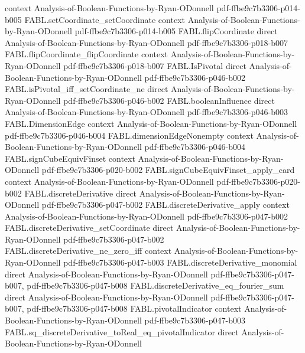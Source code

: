 \begin{theorem}
  {context}
  {Analysis-of-Boolean-Functions-by-Ryan-ODonnell}
  {pdf-ffbe9c7b3306-p014-b005}
\proofstep
  {FABL.setCoordinate_setCoordinate}
  {context}
  {Analysis-of-Boolean-Functions-by-Ryan-ODonnell}
  {pdf-ffbe9c7b3306-p014-b005}
\proofstep
  {FABL.flipCoordinate}
  {direct}
  {Analysis-of-Boolean-Functions-by-Ryan-ODonnell}
  {pdf-ffbe9c7b3306-p018-b007}
\proofstep
  {FABL.flipCoordinate_flipCoordinate}
  {context}
  {Analysis-of-Boolean-Functions-by-Ryan-ODonnell}
  {pdf-ffbe9c7b3306-p018-b007}
\proofstep
  {FABL.IsPivotal}
  {direct}
  {Analysis-of-Boolean-Functions-by-Ryan-ODonnell}
  {pdf-ffbe9c7b3306-p046-b002}
\proofstep
  {FABL.isPivotal_iff_setCoordinate_ne}
  {direct}
  {Analysis-of-Boolean-Functions-by-Ryan-ODonnell}
  {pdf-ffbe9c7b3306-p046-b002}
\proofstep
  {FABL.booleanInfluence}
  {direct}
  {Analysis-of-Boolean-Functions-by-Ryan-ODonnell}
  {pdf-ffbe9c7b3306-p046-b003}
\proofstep
  {FABL.DimensionEdge}
  {context}
  {Analysis-of-Boolean-Functions-by-Ryan-ODonnell}
  {pdf-ffbe9c7b3306-p046-b004}
\proofstep
  {FABL.dimensionEdgeNonempty}
  {context}
  {Analysis-of-Boolean-Functions-by-Ryan-ODonnell}
  {pdf-ffbe9c7b3306-p046-b004}
\proofstep
  {FABL.signCubeEquivFinset}
  {context}
  {Analysis-of-Boolean-Functions-by-Ryan-ODonnell}
  {pdf-ffbe9c7b3306-p020-b002}
\proofstep
  {FABL.signCubeEquivFinset_apply_card}
  {context}
  {Analysis-of-Boolean-Functions-by-Ryan-ODonnell}
  {pdf-ffbe9c7b3306-p020-b002}
\proofstep
  {FABL.discreteDerivative}
  {direct}
  {Analysis-of-Boolean-Functions-by-Ryan-ODonnell}
  {pdf-ffbe9c7b3306-p047-b002}
\proofstep
  {FABL.discreteDerivative_apply}
  {context}
  {Analysis-of-Boolean-Functions-by-Ryan-ODonnell}
  {pdf-ffbe9c7b3306-p047-b002}
\proofstep
  {FABL.discreteDerivative_setCoordinate}
  {direct}
  {Analysis-of-Boolean-Functions-by-Ryan-ODonnell}
  {pdf-ffbe9c7b3306-p047-b002}
\proofstep
  {FABL.discreteDerivative_ne_zero_iff}
  {context}
  {Analysis-of-Boolean-Functions-by-Ryan-ODonnell}
  {pdf-ffbe9c7b3306-p047-b003}
\proofstep
  {FABL.discreteDerivative_monomial}
  {direct}
  {Analysis-of-Boolean-Functions-by-Ryan-ODonnell}
  {pdf-ffbe9c7b3306-p047-b007,
    pdf-ffbe9c7b3306-p047-b008}
\proofstep
  {FABL.discreteDerivative_eq_fourier_sum}
  {direct}
  {Analysis-of-Boolean-Functions-by-Ryan-ODonnell}
  {pdf-ffbe9c7b3306-p047-b007,
    pdf-ffbe9c7b3306-p047-b008}
\proofstep
  {FABL.pivotalIndicator}
  {context}
  {Analysis-of-Boolean-Functions-by-Ryan-ODonnell}
  {pdf-ffbe9c7b3306-p047-b003}
\proofstep
  {FABL.sq_discreteDerivative_toReal_eq_pivotalIndicator}
  {direct}
  {Analysis-of-Boolean-Functions-by-Ryan-ODonnell}

\end{theorem}
